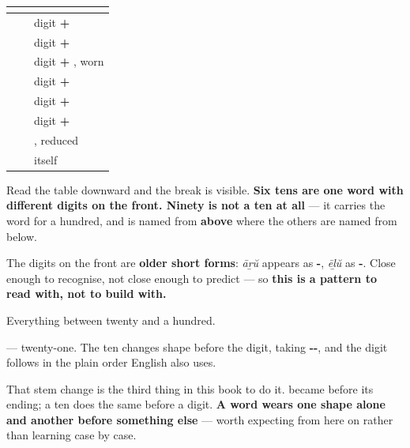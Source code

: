 \begin{grammarlens}[title={Grammar Lens: six of one word, then two that are not}]
\noindent
\begin{tabularx}{\linewidth}{@{}>{\raggedright\arraybackslash}X>{\raggedright\arraybackslash}X>{\raggedright\arraybackslash}X@{}}
\toprule
\textbf{} & \textbf{} & \textbf{} \\
\midrule
\textbf{\ml{മുപ്പത്}} & 30 & digit \textbf{+ \ml{പത്ത്}} \\
\textbf{\ml{നാൽപത്}} & 40 & digit \textbf{+ \ml{പത്ത്}} \\
\textbf{\ml{അമ്പത്}} & 50 & digit \textbf{+ \ml{പത്ത്}}, worn \\
\textbf{\ml{അറുപത്}} & 60 & digit \textbf{+ \ml{പത്ത്}} \\
\textbf{\ml{എഴുപത്}} & 70 & digit \textbf{+ \ml{പത്ത്}} \\
\textbf{\ml{എൺപത്}} & 80 & digit \textbf{+ \ml{പത്ത്}} \\
\textbf{\ml{തൊണ്ണൂറ്}} & 90 & \textbf{\ml{നൂറ്}}, reduced \\
\textbf{\ml{നൂറ്}} & 100 & itself \\
\bottomrule
\end{tabularx}

Read the table downward and the break is visible. \textbf{Six tens are one word with different digits on the front. Ninety is not a ten at all} — it carries the word for a hundred, and is named from \textbf{above} where the others are named from below.

The digits on the front are \textbf{older short forms}: \emph{āṟŭ} appears as \textbf{-}, \emph{ēḻŭ} as \textbf{-}. Close enough to recognise, not close enough to predict — so \textbf{this is a pattern to read with, not to build with.}
\end{grammarlens}

\begin{grammarlens}[title={What you've built}]
Everything between twenty and a hundred.

\textbf{} — twenty-one. The ten changes shape before the digit, taking \textbf{--}, and the digit follows in the plain order English also uses.

That stem change is the third thing in this book to do it. \textbf{} became \textbf{} before its ending; a ten does the same before a digit. \textbf{A word wears one shape alone and another before something else} — worth expecting from here on rather than learning case by case.
\end{grammarlens}


